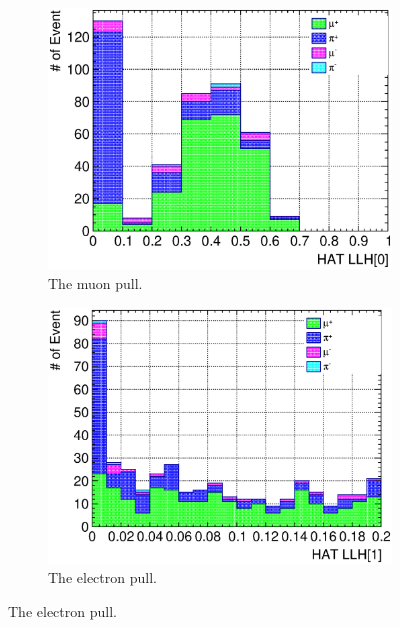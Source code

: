           \begin{figure}[ht]
               \centering
               \begin{subfigure}{\dbfigwid\textwidth}
                    \includegraphics[width=\textwidth]{figures/sel/sspi_TOP_hat_pid0_stack_al5.eps}
                    \caption{The muon pull.}
                    \label{subfig:sppi-pulls-1}
               \end{subfigure}
               \begin{subfigure}{\dbfigwid\textwidth}
                    \includegraphics[width=\textwidth]{figures/sel/sspi_TOP_hat_pid1_stack_al5.eps}
                    \caption{The electron pull.}
                    \label{subfig:sppi-pulls-2}

\end{subfigure}
\end{figure}
